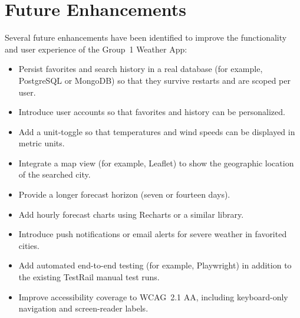 \documentclass[11pt,letterpaper]{article}
\begin{document}
\section{Future Enhancements}
Several future enhancements have been identified to improve the functionality and user experience of the Group~1 Weather App:
\begin{itemize}
  \item Persist favorites and search history in a real database (for example, PostgreSQL or MongoDB) so that they survive restarts and are scoped per user.
  \item Introduce user accounts so that favorites and history can be personalized.
  \item Add a unit-toggle so that temperatures and wind speeds can be displayed in metric units.
  \item Integrate a map view (for example, Leaflet) to show the geographic location of the searched city.
  \item Provide a longer forecast horizon (seven or fourteen days).
  \item Add hourly forecast charts using Recharts or a similar library.
  \item Introduce push notifications or email alerts for severe weather in favorited cities.
  \item Add automated end-to-end testing (for example, Playwright) in addition to the existing TestRail manual test runs.
  \item Improve accessibility coverage to WCAG~2.1 AA, including keyboard-only navigation and screen-reader labels.
\end{itemize}
\end{document}
